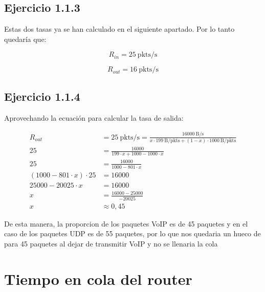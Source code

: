 \subsection{Ejercicio 1.1.3}

Estas dos tasas ya se han calculado en el siguiente apartado. Por lo tanto quedaría que:

\[
  R_{in} = 25~\mathrm{pkts/s}
\]

\[
  R_{out} = 16~\mathrm{pkts/s}
\]

\subsection{Ejercicio 1.1.4}

Aprovechando la ecuación para calcular la tasa de salida:

\begin{equation}
    \begin{aligned}
      R_{out} &= 25~\mathrm{pkts/s} = \frac{16000~\mathrm{B/s}}{ x \cdot 199~\mathrm{B/pkts} + (1 - x) \cdot 1000~\mathrm{B/pkts}} \\
      25 &= \frac{16000}{ 199 \cdot x + 1000 - 1000 \cdot x} \\
      25 &= \frac{16000}{1000 - 801 \cdot x} \\
      (1000 - 801 \cdot x) \cdot 25 &= 16000 \\
      25000 - 20025 \cdot x &= 16000 \\
      x &= \frac{16000 - 25000}{-20025} \\
      x &\approx 0,45
    \end{aligned}
\end{equation}

De esta manera, la proporcion de los paquetes VoIP es de 45 paquetes y en el caso de los paquetes UDP es de 55 paquetes, por lo que
nos quedaria un hueco de para 45 paquetes al dejar de transmitir VoIP y no se llenaria la cola

\section{Tiempo en cola del router}

